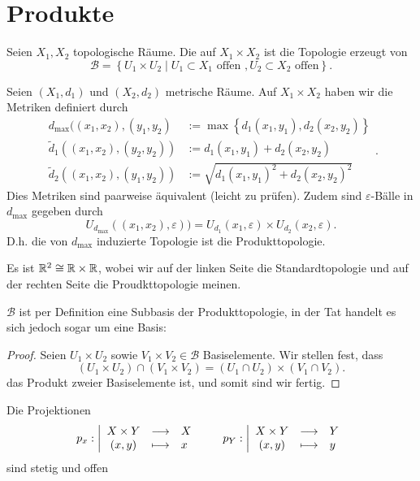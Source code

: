 \section{Produkte}
\begin{definition}
    Seien $X_1,X_2$ topologische Räume. Die  auf $X_1\times X_2$ ist die Topologie erzeugt von
    \[
    \mathcal{B} = \left \{U_1\times U_2 \mid  U_1\subset X_1 \text{ offen }, U_2\subset X_2\text{ offen}\right\} 
    .\] 
\end{definition}
\begin{example}
    Seien $(X_1,d_1)$ und $(X_2,d_2)$ metrische Räume. Auf $X_1\times X_2$ haben wir die Metriken definiert durch
    \[
        \begin{split}
            d_{\max} ((x_1,x_2),(y_1,y_2) &:= \max \left \{d_1(x_1,y_1), d_2(x_2,y_2)\right\}  \\
            \tilde{d}_1((x_1,x_2),(y_2,y_2)) &:= d_1(x_1,y_1) + d_2(x_2,y_2) \\
            \tilde{d}_2((x_1,x_2),(y_1,y_2)) &:= \sqrt{d_1(x_1,y_1)^2 + d_2(x_2,y_2)^2} 
        \end{split}
    .\] 
    Dies Metriken sind paarweise äquivalent (leicht zu prüfen). Zudem sind $ε$-Bälle in  $d_{\max}$ gegeben durch
    \[
        U_{d_{\max}}((x_1,x_2),ε)) = U_{d_1}(x_1,ε) \times U_{d_2}(x_2,ε)
    .\] 
    D.h. die von $d_{\max}$ induzierte Topologie ist die Produkttopologie.
\end{example}
\begin{example}
    Es ist $\mathbb{R}^2 \cong \mathbb{R} \times \mathbb{R}$, wobei wir auf der linken Seite die Standardtopologie und auf der rechten Seite die Proudkttopologie meinen.
\end{example}
\begin{remark}
    $\mathcal{B}$ ist per Definition eine Subbasis der Produkttopologie, in der Tat handelt es sich jedoch sogar um eine Basis:
    \begin{proof}
        Seien $U_1\times U_2$ sowie $V_1\times V_2\in \mathcal{B}$ Basiselemente. Wir stellen fest, dass
        \[
            (U_1\times U_2)\cap (V_1\times V_2) = (U_1\cap U_2) \times (V_1\cap V_2)
        .\] 
        das Produkt zweier Basiselemente ist, und somit sind wir fertig.
    \end{proof}
\end{remark}
\begin{theorem}
    Die Projektionen
        \begin{equation*}
        p_x: \left| \begin{array}{c c l} 
        X\times Y & \longrightarrow & X \\
        (x,y) & \longmapsto &  x
        \end{array} \right.
        \qquad
        p_Y: \left| \begin{array}{c c l} 
            X\times Y & \longrightarrow & Y \\
            (x,y) & \longmapsto	 &  y
        \end{array} \right.
    \end{equation*}
    sind stetig und offen
\end{theorem}
